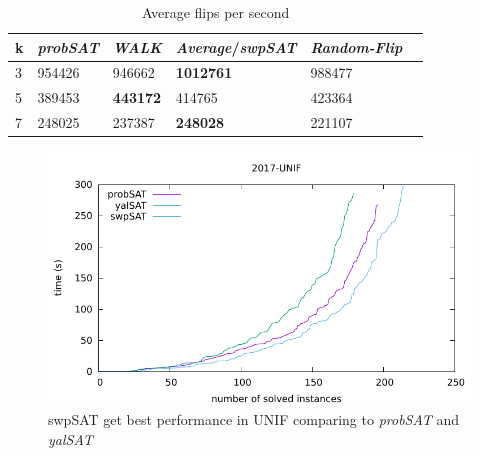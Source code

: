 \documentclass[12pt,a4paper,twoside]{scrartcl}
\numberwithin{equation}{section}
\begin{document}
   \begin{table}[H]
   \label{tab:flips}
\begin{center}
    \begin{tabular}{|l|l|l|l|l|p{3cm}|}
\hline 

    k &\emph{probSAT}&\emph{WALK}&\emph{Average}/\emph{swpSAT}&\emph{Random-Flip} \\ \hline      
    3& 954426 &946662 &\textbf{1012761}&988477 \\ \hline
    5& 389453&\textbf{443172}&414765&423364\\ \hline
    7& 248025 &237387 &\textbf{248028}&221107 \\ \hline
	
\end{tabular}
\end{center}
\caption{Average flips per second}
\end{table}
  \begin{figure}[H]
\begin{center}
  \includegraphics[scale = 1]{DATA/UNIF/e5.pdf}
  \end{center}
  \caption{swpSAT get best performance in UNIF comparing to \emph{probSAT} and \emph{yalSAT} }
  \label{Experiment 9 all cactus plot}
  \end{figure} 
\clearpage
\clearpage
\end{document}
